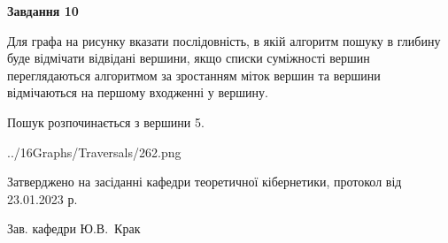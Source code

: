 \documentclass[12pt, ukrainian]{article}
\begin{document}
{\begin {large}
{\begin {center}\textbf{Завдання 10}\end {center}}\par
Для графа на рисунку вказати послідовність, в якій алгоритм пошуку в глибину буде відмічати відвідані вершини, якщо списки суміжності вершин переглядаються алгоритмом за зростанням міток вершин та вершини відмічаються на першому вход\-женні у вершину.\par
Пошук розпочинається з вершини 5.\par

\begin{center}
	{../16Graphs/Traversals/262.png}
\end{center}\par
\newpage


\end {large}
}
{\smallskip \begin {small} Затверджено на засіданні кафедри теоретичної кібернетики, протокол  від   23.01.2023 р.\par\smallskip\smallskip
{\parbox {6.5 cm}{Зав. кафедри \dotfill Ю.В.~Крак}} \end{small}}
\end{document}
